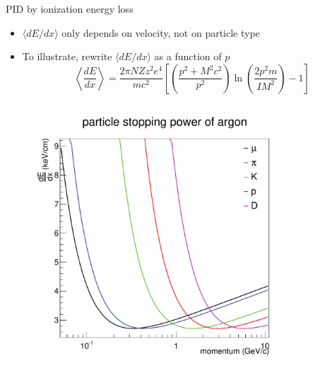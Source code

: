 \documentclass{beamer}
\begin{document}
\begin{frame}{PID by ionization energy loss}
\begin{itemize}
  \item $\langle dE/dx \rangle$ only depends on velocity, not on particle type
  \item To illustrate, rewrite $\langle dE/dx \rangle$ as a function of $p$
  \begin{equation}
    \left\langle\frac{dE}{dx}\right\rangle=\frac{2\pi NZz^2e^4}{mc^2}\left[ \left( \frac{p^2+M^2c^2}{p^2} \right)  \ln\left( \frac{2p^2m}{IM^2} \right) -1 \right]
  \end{equation}
\end{itemize}
\begin{columns}
  \begin{column}{.5\textwidth}
    \begin{figure}
    \includegraphics[width=\textwidth]{plots/dEdx.pdf}
    \end{figure}
  \end{column}
  \begin{column}{.5\textwidth}
    \begin{figure}

\end{figure}
\end{column}
\end{columns}
\end{frame}
\end{document}
